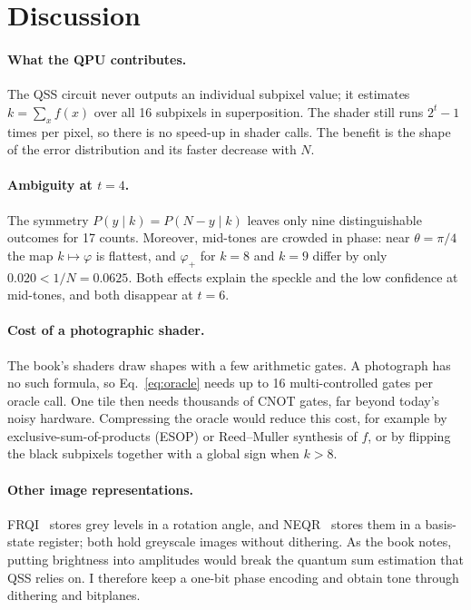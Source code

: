 \documentclass[10pt,twocolumn,a4paper]{article}
\begin{document}
\section{Discussion}\label{sec:disc}

\paragraph{What the QPU contributes.}
The QSS circuit never outputs an individual subpixel value; it estimates
$k=\sum_x f(x)$ over all 16 subpixels in superposition. The shader still
runs $2^t-1$ times per pixel, so there is no speed-up in shader calls. The
benefit is the shape of the error distribution and its faster decrease with
$N$.

\paragraph{Ambiguity at $t=4$.}
The symmetry $P(y\mid k)=P(N-y\mid k)$ leaves only nine distinguishable
outcomes for 17 counts. Moreover, mid-tones are crowded in phase: near
$\theta=\pi/4$ the map $k\mapsto\varphi$ is flattest, and $\varphi_+$ for
$k=8$ and $k=9$ differ by only $0.020<1/N=0.0625$. Both effects explain the
speckle and the low confidence at mid-tones, and both disappear at $t=6$.

\paragraph{Cost of a photographic shader.}
The book's shaders draw shapes with a few arithmetic gates. A photograph has
no such formula, so Eq.~\eqref{eq:oracle} needs up to 16 multi-controlled gates
per oracle call. One tile then needs thousands of CNOT gates, far beyond
today's noisy hardware. Compressing the oracle would reduce this cost, for
example by exclusive-sum-of-products (ESOP) or Reed--Muller synthesis of $f$,
or by flipping the black subpixels together with a global sign when $k>8$.

\paragraph{Other image representations.}
FRQI~\cite{frqi} stores grey levels in a rotation angle, and
NEQR~\cite{neqr} stores them in a basis-state register; both hold greyscale
images without dithering. As the book notes, putting brightness into
amplitudes would break the quantum sum estimation that QSS relies on. I
therefore keep a one-bit phase encoding and obtain tone through dithering and
bitplanes.
\end{document}
